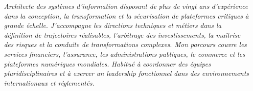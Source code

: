 

\vspace{1em}

\begin{cvparagraph}
\emph{
Architecte des systèmes d’information disposant de plus de vingt ans d’expérience dans la conception, la transformation et la sécurisation de plateformes critiques à grande échelle.
J’accompagne les directions techniques et métiers dans la définition de trajectoires réalisables, l’arbitrage des investissements, la maîtrise des risques et la conduite de transformations complexes.
Mon parcours couvre les services financiers, l’assurance, les administrations publiques, le commerce et les plateformes numériques mondiales. Habitué à coordonner des équipes pluridisciplinaires
et à exercer un leadership fonctionnel dans des environnements internationaux et réglementés.
}
\end{cvparagraph}


